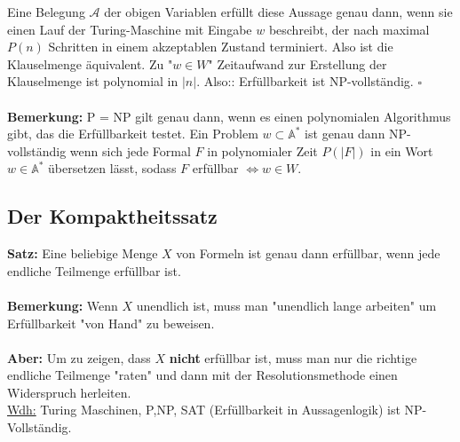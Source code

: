 \documentclass[a4paper]{scrartcl}
\begin{document}
Eine Belegung $\mathcal{A}$ der obigen Variablen erfüllt diese Aussage genau dann, wenn sie einen Lauf der Turing-Maschine mit Eingabe $w$ beschreibt, der nach maximal $P(n)$ Schritten in einem akzeptablen Zustand terminiert. Also ist die Klauselmenge äquivalent. Zu "$w \in W$" Zeitaufwand zur Erstellung der Klauselmenge ist polynomial in $|n|$. Also:: Erfüllbarkeit ist NP-vollständig. $\square$
\bigskip\\\\
\textbf{Bemerkung:} P = NP gilt genau dann, wenn es einen polynomialen Algorithmus gibt, das die Erfüllbarkeit testet. Ein Problem $w \subset \mathbb{A}^*$ ist genau dann NP-vollständig wenn sich jede Formal $F$ in polynomialer Zeit $P(|F|)$ in ein Wort $w \in \mathbb{A}^*$ übersetzen lässt, sodass $F$ erfüllbar $\Leftrightarrow w \in W$.
\newpage
\subsection{Der Kompaktheitssatz}
\textbf{Satz:} Eine beliebige Menge $X$ von Formeln ist genau dann erfüllbar, wenn jede endliche Teilmenge erfüllbar ist.
\bigskip\\\\
\textbf{Bemerkung:} Wenn $X$ unendlich ist, muss man "unendlich lange arbeiten" um Erfüllbarkeit "von Hand" zu beweisen.
\bigskip\\\\
\textbf{Aber:} Um zu zeigen, dass $X$ \textbf{nicht} erfüllbar ist, muss man nur die richtige endliche Teilmenge "raten" und dann mit der Resolutionsmethode einen Widerspruch herleiten.\\
\underline{Wdh:} Turing Maschinen, P,NP, SAT (Erfüllbarkeit in Aussagenlogik) ist NP-Vollständig.\\
\end{document}
